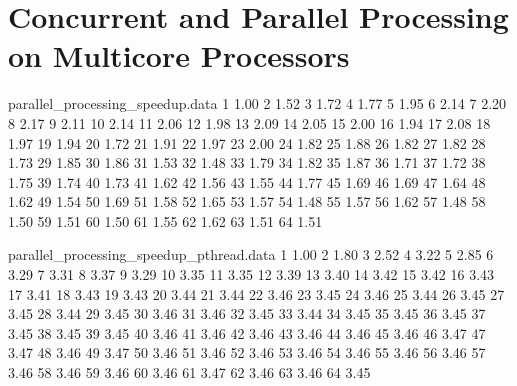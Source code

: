 \section{Concurrent and Parallel Processing on Multicore Processors}

\begin{filecontents}{parallel_processing_speedup.data}
1  1.00
2  1.52
3  1.72
4  1.77
5  1.95
6  2.14
7  2.20
8  2.17
9  2.11
10 2.14
11 2.06
12 1.98
13 2.09
14 2.05
15 2.00
16 1.94
17 2.08
18 1.97
19 1.94
20 1.72
21 1.91
22 1.97
23 2.00
24 1.82
25 1.88
26 1.82
27 1.82
28 1.73
29 1.85
30 1.86
31 1.53
32 1.48
33 1.79
34 1.82
35 1.87
36 1.71
37 1.72
38 1.75
39 1.74
40 1.73
41 1.62
42 1.56
43 1.55
44 1.77
45 1.69
46 1.69
47 1.64
48 1.62
49 1.54
50 1.69
51 1.58
52 1.65
53 1.57
54 1.48
55 1.57
56 1.62
57 1.48
58 1.50
59 1.51
60 1.50
61 1.55
62 1.62
63 1.51
64 1.51
\end{filecontents}

\begin{filecontents}{parallel_processing_speedup_pthread.data}
1 1.00
2 1.80
3 2.52
4 3.22
5 2.85
6 3.29
7 3.31
8 3.37
9 3.29
10 3.35
11 3.35
12 3.39
13 3.40
14 3.42
15 3.42
16 3.43
17 3.41
18 3.43
19 3.43
20 3.44
21 3.44
22 3.46
23 3.45
24 3.46
25 3.44
26 3.45
27 3.45
28 3.44
29 3.45
30 3.46
31 3.46
32 3.45
33 3.44
34 3.45
35 3.45
36 3.45
37 3.45
38 3.45
39 3.45
40 3.46
41 3.46
42 3.46
43 3.46
44 3.46
45 3.46
46 3.47
47 3.47
48 3.46
49 3.47
50 3.46
51 3.46
52 3.46
53 3.46
54 3.46
55 3.46
56 3.46
57 3.46
58 3.46
59 3.46
60 3.46
61 3.47
62 3.46
63 3.46
64 3.45
\end{filecontents}

